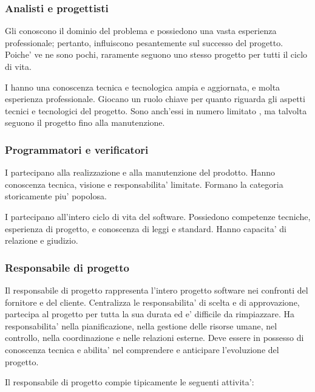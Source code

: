 
\subsubsection{Analisti e progettisti}

Gli  conoscono il dominio del problema e possiedono una vasta
esperienza professionale; pertanto, influiscono pesantemente sul successo del
progetto. Poiche' ve ne sono pochi, raramente seguono uno stesso progetto per
tutti il ciclo di vita. 

I  hanno una conoscenza tecnica e tecnologica ampia e
aggiornata, e molta esperienza professionale. Giocano un ruolo chiave per quanto
riguarda gli aspetti tecnici e tecnologici del progetto. Sono anch'essi in
numero limitato , ma talvolta seguono il progetto fino alla
manutenzione.

\subsubsection{Programmatori e verificatori}

I  partecipano alla realizzazione e alla manutenzione del
prodotto. Hanno conoscenza tecnica, visione e responsabilita' limitate. Formano
la categoria storicamente piu' popolosa.

I  partecipano all'intero ciclo di vita del software.
Possiedono competenze tecniche, esperienza di progetto, e conoscenza di leggi e
standard. Hanno capacita' di relazione e giudizio.

\subsubsection{Responsabile di progetto}

Il responsabile di progetto rappresenta l'intero progetto software nei confronti
del fornitore e del cliente. Centralizza le responsabilita' di scelta e di
approvazione, partecipa al progetto per tutta la sua durata ed e' difficile da
rimpiazzare. Ha responsabilita' nella pianificazione, nella gestione delle
risorse umane, nel controllo, nella coordinazione e nelle relazioni esterne.
Deve essere in possesso di conoscenza tecnica e abilita' nel comprendere e
anticipare l'evoluzione del progetto.

Il responsabile di progetto compie tipicamente le seguenti attivita':

